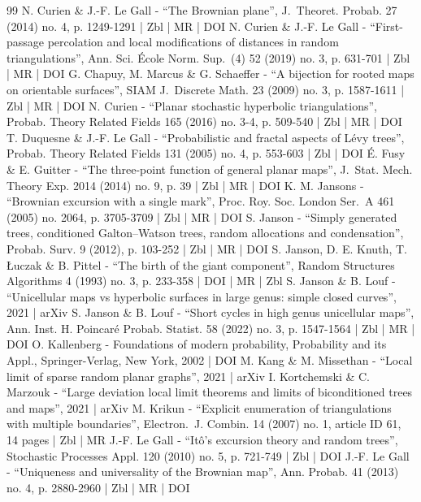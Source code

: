 \begin{thebibliography}{99}
N. Curien \& J.-F. Le Gall - “The Brownian plane”, J. Theoret. Probab. 27 (2014) no. 4, p. 1249-1291 | Zbl | MR | DOI
N. Curien \& J.-F. Le Gall - “First-passage percolation and local modifications of distances in random triangulations”, Ann. Sci. École Norm. Sup. (4) 52 (2019) no. 3, p. 631-701 | Zbl | MR | DOI
G. Chapuy, M. Marcus \& G. Schaeffer - “A bijection for rooted maps on orientable surfaces”, SIAM J. Discrete Math. 23 (2009) no. 3, p. 1587-1611 | Zbl | MR | DOI
N. Curien - “Planar stochastic hyperbolic triangulations”, Probab. Theory Related Fields 165 (2016) no. 3-4, p. 509-540 | Zbl | MR | DOI
T. Duquesne \& J.-F. Le Gall - “Probabilistic and fractal aspects of Lévy trees”, Probab. Theory Related Fields 131 (2005) no. 4, p. 553-603 | Zbl | DOI
É. Fusy \& E. Guitter - “The three-point function of general planar maps”, J. Stat. Mech. Theory Exp. 2014 (2014) no. 9, p. 39 | Zbl | MR | DOI
K. M. Jansons - “Brownian excursion with a single mark”, Proc. Roy. Soc. London Ser. A 461 (2005) no. 2064, p. 3705-3709 | Zbl | MR | DOI
S. Janson - “Simply generated trees, conditioned Galton–Watson trees, random allocations and condensation”, Probab. Surv. 9 (2012), p. 103-252 | Zbl | MR | DOI
S. Janson, D. E. Knuth, T. Łuczak \& B. Pittel - “The birth of the giant component”, Random Structures Algorithms 4 (1993) no. 3, p. 233-358 | DOI | MR | Zbl
S. Janson \& B. Louf - “Unicellular maps vs hyperbolic surfaces in large genus: simple closed curves”, 2021 | arXiv
S. Janson \& B. Louf - “Short cycles in high genus unicellular maps”, Ann. Inst. H. Poincaré Probab. Statist. 58 (2022) no. 3, p. 1547-1564 | Zbl | MR | DOI
O. Kallenberg - Foundations of modern probability, Probability and its Appl., Springer-Verlag, New York, 2002 | DOI
M. Kang \& M. Missethan - “Local limit of sparse random planar graphs”, 2021 | arXiv
I. Kortchemski \& C. Marzouk - “Large deviation local limit theorems and limits of biconditioned trees and maps”, 2021 | arXiv
M. Krikun - “Explicit enumeration of triangulations with multiple boundaries”, Electron. J. Combin. 14 (2007) no. 1, article ID 61, 14 pages | Zbl | MR
J.-F. Le Gall - “Itô’s excursion theory and random trees”, Stochastic Processes Appl. 120 (2010) no. 5, p. 721-749 | Zbl | DOI
J.-F. Le Gall - “Uniqueness and universality of the Brownian map”, Ann. Probab. 41 (2013) no. 4, p. 2880-2960 | Zbl | MR | DOI

\end{thebibliography}
